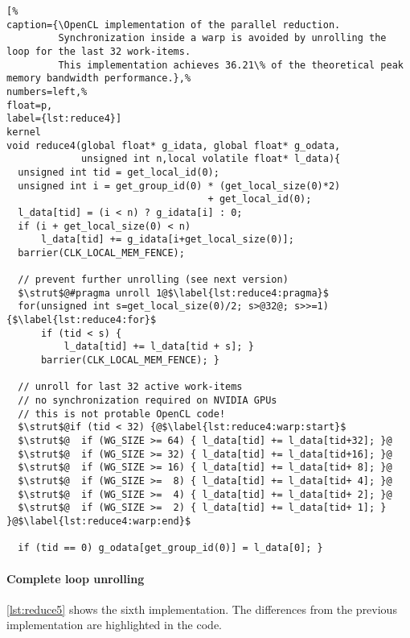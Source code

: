 \begin{lstlisting}[%                                                             
caption={\OpenCL implementation of the parallel reduction.
         Synchronization inside a warp is avoided by unrolling the loop for the last 32 work-items.
         This implementation achieves 36.21\% of the theoretical peak memory bandwidth performance.},%
numbers=left,%
float=p,
label={lst:reduce4}]
kernel
void reduce4(global float* g_idata, global float* g_odata,
             unsigned int n,local volatile float* l_data){
  unsigned int tid = get_local_id(0);
  unsigned int i = get_group_id(0) * (get_local_size(0)*2)
                                   + get_local_id(0);
  l_data[tid] = (i < n) ? g_idata[i] : 0;
  if (i + get_local_size(0) < n) 
      l_data[tid] += g_idata[i+get_local_size(0)];  
  barrier(CLK_LOCAL_MEM_FENCE);

  // prevent further unrolling (see next version)
  $\strut$@#pragma unroll 1@$\label{lst:reduce4:pragma}$
  for(unsigned int s=get_local_size(0)/2; s>@32@; s>>=1) {$\label{lst:reduce4:for}$
      if (tid < s) {
          l_data[tid] += l_data[tid + s]; }
      barrier(CLK_LOCAL_MEM_FENCE); }

  // unroll for last 32 active work-items
  // no synchronization required on NVIDIA GPUs
  // this is not protable OpenCL code!
  $\strut$@if (tid < 32) {@$\label{lst:reduce4:warp:start}$
  $\strut$@  if (WG_SIZE >= 64) { l_data[tid] += l_data[tid+32]; }@
  $\strut$@  if (WG_SIZE >= 32) { l_data[tid] += l_data[tid+16]; }@
  $\strut$@  if (WG_SIZE >= 16) { l_data[tid] += l_data[tid+ 8]; }@
  $\strut$@  if (WG_SIZE >=  8) { l_data[tid] += l_data[tid+ 4]; }@
  $\strut$@  if (WG_SIZE >=  4) { l_data[tid] += l_data[tid+ 2]; }@
  $\strut$@  if (WG_SIZE >=  2) { l_data[tid] += l_data[tid+ 1]; } }@$\label{lst:reduce4:warp:end}$

  if (tid == 0) g_odata[get_group_id(0)] = l_data[0]; }
\end{lstlisting}

\paragraph{Complete loop unrolling}

\autoref{lst:reduce5} shows the sixth implementation.
The differences from the previous implementation are highlighted in the code.

